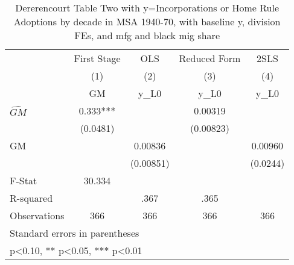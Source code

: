 \begin{table}[htbp]\centering
\def\sym#1{\ifmmode^{#1}\else\(^{#1}\)\fi}
\caption{Dererencourt Table Two with y=Incorporations or Home Rule Adoptions by decade in MSA 1940-70, with baseline y, division FEs, and mfg and black mig share}
\begin{tabular}{l*{4}{c}}
\toprule
                    & First Stage   &         OLS   &Reduced Form   &        2SLS   \\
                    &\multicolumn{1}{c}{(1)}&\multicolumn{1}{c}{(2)}&\multicolumn{1}{c}{(3)}&\multicolumn{1}{c}{(4)}\\
                    &\multicolumn{1}{c}{GM}&\multicolumn{1}{c}{y\_L0}&\multicolumn{1}{c}{y\_L0}&\multicolumn{1}{c}{y\_L0}\\
\midrule
$\hat{GM}$          &       0.333***&               &     0.00319   &               \\
                    &    (0.0481)   &               &   (0.00823)   &               \\
\addlinespace
GM                  &               &     0.00836   &               &     0.00960   \\
                    &               &   (0.00851)   &               &    (0.0244)   \\
\midrule
F-Stat              &      30.334   &               &               &               \\
R-squared           &               &        .367   &        .365   &               \\
Observations        &         366   &         366   &         366   &         366   \\
\bottomrule
\multicolumn{5}{l}{\footnotesize Standard errors in parentheses}\\
\multicolumn{5}{l}{\footnotesize * p<0.10, ** p<0.05, *** p<0.01}\\
\end{tabular}
\end{table}
